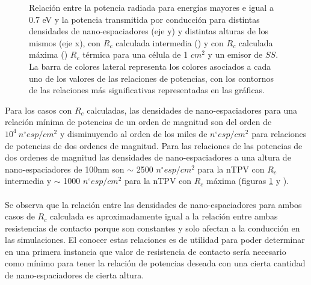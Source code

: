 \begin{figure}[H]
\begin{subfigure}[b]{0.49\textwidth}
	\end{subfigure}
	\caption{\small Relación entre la potencia radiada para energías mayores e igual a 0.7 eV y la potencia transmitida por conducción para distintas densidades de nano-espaciadores (eje y) y distintas alturas de los mismos (eje x), con $R_c$ calculada intermedia () y con $R_c$ calculada máxima () $R_c$ térmica para una célula de 1 $cm^2$ y un emisor de $SS$. La barra de colores lateral representa los colores asociados a cada uno de los valores de las relaciones de potencias, con los contornos de las relaciones más significativas representadas en las gráficas.
}
	\label{fig:rels_SsSiO2Ge_Prc1vsPrc2}
\end{figure}
Para los casos con $R_c$ calculadas, las densidades de nano-espaciadores para una relación mínima de potencias de un orden de magnitud son del orden de $10^4 \ n^{\circ}esp/cm^2$ y disminuyendo al orden de los miles de $n^{\circ}esp/cm^2$ para relaciones de potencias de dos ordenes de magnitud. Para las relaciones de las potencias de dos ordenes de magnitud las densidades de nano-espaciadores a una altura de nano-espaciadores de 100nm son $\sim$ 2500 $n^{\circ} esp/cm^2$ para la nTPV con $R_c$ intermedia y $\sim$ 1000 $n^{\circ} esp/cm^2$ para la nTPV con $R_c$ máxima (figuras \ref{fig:rels_SsSiO2Ge_Prc1vsPrc2}  y ).\\\\
Se observa que la relación entre las densidades de nano-espaciadores para ambos casos de $R_c$ calculada es aproximadamente igual a la relación entre ambas resistencias de contacto porque son constantes y solo afectan a la conducción en las simulaciones. El conocer estas relaciones es de utilidad para poder determinar en una primera instancia que valor de resistencia de contacto sería necesario como mínimo para tener la relación de potencias deseada con una cierta cantidad de nano-espaciadores de cierta altura.\\\\
